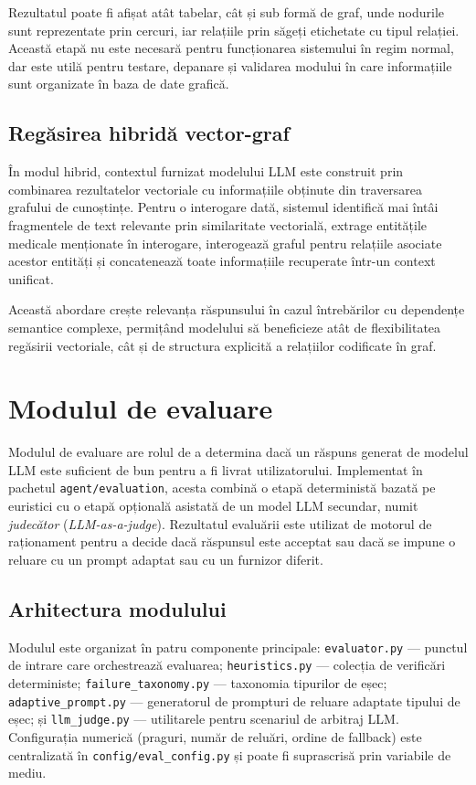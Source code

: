 \documentclass[12pt, a4paper, oneside, romanian]{teza-upb}
\begin{document}
Rezultatul poate fi afișat atât tabelar, cât și sub formă de graf, unde nodurile sunt reprezentate prin cercuri, iar relațiile prin săgeți etichetate cu tipul relației. Această etapă nu este necesară pentru funcționarea sistemului în regim normal, dar este utilă pentru testare, depanare și validarea modului în care informațiile sunt organizate în baza de date grafică.


\subsection{Regăsirea hibridă vector-graf}

În modul hibrid, contextul furnizat modelului LLM este construit prin combinarea rezultatelor vectoriale cu informațiile obținute din traversarea grafului de cunoștințe. Pentru o interogare dată, sistemul identifică mai întâi fragmentele de text relevante prin similaritate vectorială, extrage entitățile medicale menționate în interogare, interogează graful pentru relațiile asociate acestor entități și concatenează toate informațiile recuperate într-un context unificat.

Această abordare crește relevanța răspunsului în cazul întrebărilor cu dependențe semantice complexe, permițând modelului să beneficieze atât de flexibilitatea regăsirii vectoriale, cât și de structura explicită a relațiilor codificate în graf.

\section{Modulul de evaluare}
\label{sec:evaluare}

Modulul de evaluare are rolul de a determina dacă un răspuns generat de modelul LLM este suficient de bun pentru a fi livrat utilizatorului. Implementat în pachetul \texttt{agent/evaluation}, acesta combină o etapă deterministă bazată pe euristici cu o etapă opțională asistată de un model LLM secundar, numit \textit{judecător} (\textit{LLM-as-a-judge}). Rezultatul evaluării este utilizat de motorul de raționament pentru a decide dacă răspunsul este acceptat sau dacă se impune o reluare cu un prompt adaptat sau cu un furnizor diferit.

\subsection{Arhitectura modulului}

Modulul este organizat în patru componente principale: \texttt{evaluator.py} — punctul de intrare care orchestrează evaluarea; \texttt{heuristics.py} — colecția de verificări deterministe; \texttt{failure\_taxonomy.py} — taxonomia tipurilor de eșec; \texttt{adaptive\_prompt.py} — generatorul de prompturi de reluare adaptate tipului de eșec; și \texttt{llm\_judge.py} — utilitarele pentru scenariul de arbitraj LLM. Configurația numerică (praguri, număr de reluări, ordine de fallback) este centralizată în \texttt{config/eval\_config.py} și poate fi suprascrisă prin variabile de mediu.
\end{document}
